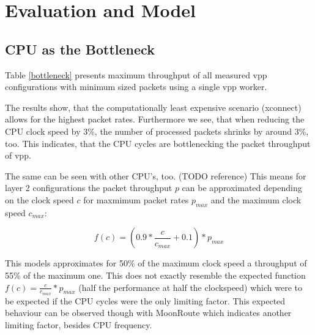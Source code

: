 \section{Evaluation and Model}







\subsection{CPU as the Bottleneck}
\label{sec:cpubottleneck}

Table \ref{bottleneck} presents maximum throughput of all
measured \Ac{vpp} configurations with minimum sized packets using a single \Ac{vpp}
worker. 

The results show, that the computationally least expensive scenario
(xconnect) allows for the highest packet rates. Furthermore we see,
that when reducing the CPU clock speed by 3\%, the number of processed
packets shrinks by around 3\%, too. This indicates, that the CPU
cycles are bottlenecking the packet throughput of \Ac{vpp}.

The same can be seen with other CPU's, too. (TODO reference) This
means for layer 2 configurations the packet throughput $p$ can be
approximated depending on the clock speed $c$ for maxmimum packet
rates $p_{max}$ and the maximum clock speed $c_{max}$:


$$ f(c) = (0.9 * \frac{c}{c_{max}} + 0.1) * p_{max} $$

This models approximates for 50\% of the maximum clock speed a
throughput of 55\% of the maximum one. This does not exactly resemble
the expected function $f(c) = \frac{c}{c_{max}} * p_{max}$ (half
the performance at half the clockspeed) which were to be expected if
the CPU cycles were the only limiting factor. This expected behaviour
can be observed though with MoonRoute \cite{chair:architecture} which
indicates another limiting factor, besides CPU
frequency.

